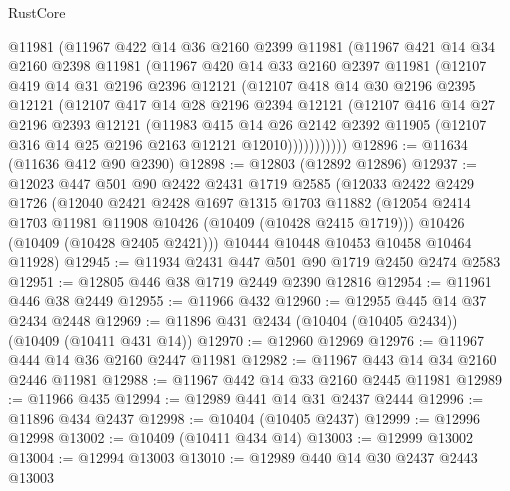 \begin{lexlean}{RustCore}
\begin{coremodule}
        @11981
        (@11967
          @422
          @14
          @36
          @2160
          @2399
          @11981
          (@11967
            @421
            @14
            @34
            @2160
            @2398
            @11981
            (@11967
              @420
              @14
              @33
              @2160
              @2397
              @11981
              (@12107
                @419
                @14
                @31
                @2196
                @2396
                @12121
                (@12107
                  @418
                  @14
                  @30
                  @2196
                  @2395
                  @12121
                  (@12107
                    @417
                    @14
                    @28
                    @2196
                    @2394
                    @12121
                    (@12107
                      @416
                      @14
                      @27
                      @2196
                      @2393
                      @12121
                      (@11983
                        @415
                        @14
                        @26
                        @2142
                        @2392
                        @11905
                        (@12107 @316 @14 @25 @2196 @2163 @12121 @12010)))))))))))
@12896 := @11634 (@11636 @412 @90 @2390)
@12898 := @12803 (@12892 @12896)
@12937 := @12023
    @447
    @501
    @90
    @2422
    @2431
    @1719
    @2585
    (@12033
      @2422
      @2429
      @1726
      (@12040
        @2421
        @2428
        @1697
        @1315
        @1703
        @11882
        (@12054 @2414 @1703 @11981 @11908 @10426 (@10409 (@10428 @2415 @1719)))
        @10426
        (@10409 (@10428 @2405 @2421)))
      @10444
      @10448
      @10453
      @10458
      @10464
      @11928)
@12945 := @11934 @2431 @447 @501 @90 @1719 @2450 @2474 @2583
@12951 := @12805 @446 @38 @1719 @2449 @2390 @12816
@12954 := @11961 @446 @38 @2449
@12955 := @11966 @432
@12960 := @12955 @445 @14 @37 @2434 @2448
@12969 := @11896 @431 @2434 (@10404 (@10405 @2434)) (@10409 (@10411 @431 @14))
@12970 := @12960 @12969
@12976 := @11967 @444 @14 @36 @2160 @2447 @11981
@12982 := @11967 @443 @14 @34 @2160 @2446 @11981
@12988 := @11967 @442 @14 @33 @2160 @2445 @11981
@12989 := @11966 @435
@12994 := @12989 @441 @14 @31 @2437 @2444
@12996 := @11896 @434 @2437
@12998 := @10404 (@10405 @2437)
@12999 := @12996 @12998
@13002 := @10409 (@10411 @434 @14)
@13003 := @12999 @13002
@13004 := @12994 @13003
@13010 := @12989 @440 @14 @30 @2437 @2443 @13003

\end{coremodule}
\end{lexlean}
